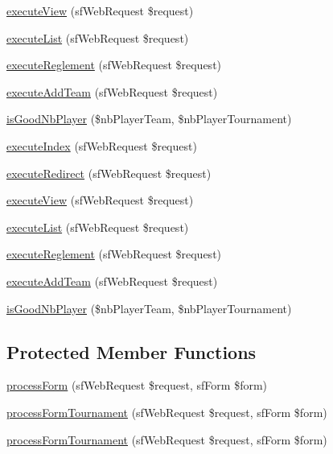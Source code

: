\begin{DoxyCompactItemize}
\hyperlink{classtournament_actions_ad61d212fa3f7e8cb4190700a8a670606}{execute\-View} (sf\-Web\-Request \$request)
\item 
\hyperlink{classtournament_actions_a0a9783a06d648bc57d630465f8efa38a}{execute\-List} (sf\-Web\-Request \$request)
\item 
\hyperlink{classtournament_actions_a1124fcc78c06d1378ea8979d5c484cad}{execute\-Reglement} (sf\-Web\-Request \$request)
\item 
\hyperlink{classtournament_actions_a44fc4db26c99e0611e5fe75ad3e1bd40}{execute\-Add\-Team} (sf\-Web\-Request \$request)
\item 
\hyperlink{classtournament_actions_ac86580b2e0573a0a4065fa3740a56527}{is\-Good\-Nb\-Player} (\$nb\-Player\-Team, \$nb\-Player\-Tournament)
\item 
\hyperlink{classtournament_actions_a948cc911eb1d9f77990be54af3b2080f}{execute\-Index} (sf\-Web\-Request \$request)
\item 
\hyperlink{classtournament_actions_a8ae69bb78141122dcb324bbe0fa7d8eb}{execute\-Redirect} (sf\-Web\-Request \$request)
\item 
\hyperlink{classtournament_actions_ad61d212fa3f7e8cb4190700a8a670606}{execute\-View} (sf\-Web\-Request \$request)
\item 
\hyperlink{classtournament_actions_a0a9783a06d648bc57d630465f8efa38a}{execute\-List} (sf\-Web\-Request \$request)
\item 
\hyperlink{classtournament_actions_a1124fcc78c06d1378ea8979d5c484cad}{execute\-Reglement} (sf\-Web\-Request \$request)
\item 
\hyperlink{classtournament_actions_a44fc4db26c99e0611e5fe75ad3e1bd40}{execute\-Add\-Team} (sf\-Web\-Request \$request)
\item 
\hyperlink{classtournament_actions_ac86580b2e0573a0a4065fa3740a56527}{is\-Good\-Nb\-Player} (\$nb\-Player\-Team, \$nb\-Player\-Tournament)
\end{DoxyCompactItemize}
\subsection*{Protected Member Functions}
\begin{DoxyCompactItemize}
\item 
\hyperlink{classtournament_actions_a7cf661d837626e0320753cbffa019a01}{process\-Form} (sf\-Web\-Request \$request, sf\-Form \$form)
\item 
\hyperlink{classtournament_actions_afb2ca081df13aae7e8887a3467300100}{process\-Form\-Tournament} (sf\-Web\-Request \$request, sf\-Form \$form)
\item 
\hyperlink{classtournament_actions_afb2ca081df13aae7e8887a3467300100}{process\-Form\-Tournament} (sf\-Web\-Request \$request, sf\-Form \$form)
\end{DoxyCompactItemize}


